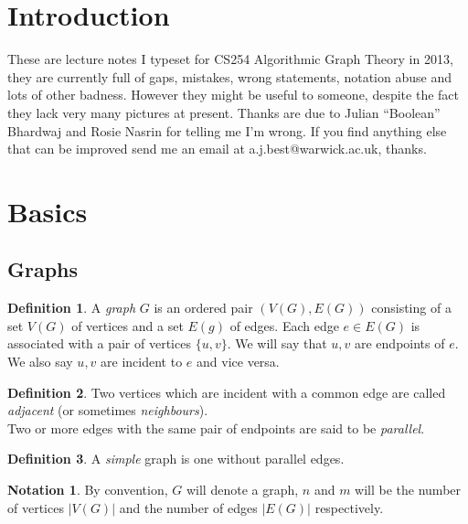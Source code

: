 \documentclass{article}
\theoremstyle{definition}
\newtheorem*{defn}{Definition}
\newtheorem*{nota}{Notation}
\begin{document}
\maketitle
\tableofcontents

\section{Introduction}
These are lecture notes I typeset for CS254 Algorithmic Graph Theory in 2013, they are currently full of gaps, mistakes, wrong statements, notation abuse and lots of other badness.
However they might be useful to someone, despite the fact they lack very many pictures at present.
Thanks are due to Julian ``Boolean'' Bhardwaj and Rosie Nasrin for telling me I'm wrong.
If you find anything else that can be improved send me an email at a.j.best@warwick.ac.uk, thanks.
\clearpage

\section{Basics}
\subsection{Graphs}
\begin{defn}
A \emph{graph} $G$ is an ordered pair $(V(G),E(G))$ consisting of a set $V(G)$ of vertices and a set $E(g)$ of edges.
Each edge $e\in E(G)$ is associated with a pair of vertices $\{u,v\}$.
We will say that $u,v$ are endpoints of $e$.
We also say $u,v$ are incident to $e$ and vice versa.
\end{defn}

\begin{defn}
Two vertices which are incident with a common edge are called \emph{adjacent} (or sometimes \emph{neighbours}). \\
Two or more edges with the same pair of endpoints are said to be \emph{parallel}.
\end{defn}

\begin{defn}
A \emph{simple} graph is one without parallel edges.
\end{defn}

\begin{nota}
By convention, $G$ will denote a graph, $n$ and $m$ will be the number of vertices $|V(G)|$ and the number of edges $|E(G)|$ respectively.
\end{nota}
\end{document}
